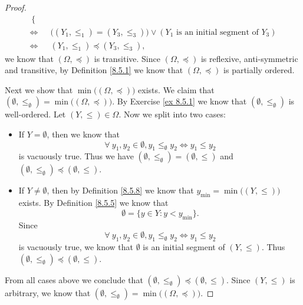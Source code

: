 \begin{proof}
\begin{align*}
\begin{cases}
        \end{cases}                                                                                                                                         \\
        \iff & \big((Y_1, \leq_1) = (Y_3, \leq_3)\big) \lor (Y_1 \text{ is an initial segment of } Y_3)                                                                           \\
        \iff & (Y_1, \leq_1) \preceq (Y_3, \leq_3),
    \end{align*}
    we know that \((\Omega, \preceq)\) is transitive.
    Since \((\Omega, \preceq)\) is reflexive, anti-symmetric and transitive, by Definition \ref{8.5.1} we know that \((\Omega, \preceq)\) is partially ordered.

    Next we show that \(\min\big((\Omega, \preceq)\big)\) exists.
    We claim that \((\emptyset, \leq_{\emptyset}) = \min\big((\Omega, \preceq)\big)\).
    By Exercise \ref{ex 8.5.1} we know that \((\emptyset, \leq_{\emptyset})\) is well-ordered.
    Let \((Y, \leq) \in \Omega\).
    Now we split into two cases:
    \begin{itemize}
        \item If \(Y = \emptyset\), then we know that
              \[
                  \forall\ y_1, y_2 \in \emptyset, y_1 \leq_{\emptyset} y_2 \iff y_1 \leq y_2
              \]
              is vacuously true.
              Thus we have \((\emptyset, \leq_{\emptyset}) = (\emptyset, \leq)\) and \((\emptyset, \leq_{\emptyset}) \preceq (\emptyset, \leq)\).
        \item If \(Y \neq \emptyset\), then by Definition \ref{8.5.8} we know that \(y_{\min} = \min\big((Y, \leq)\big)\) exists.
              By Definition \ref{8.5.5} we know that
              \[
                  \emptyset = \{y \in Y : y < y_{\min}\}.
              \]
              Since
              \[
                  \forall\ y_1, y_2 \in \emptyset, y_1 \leq_{\emptyset} y_2 \iff y_1 \leq y_2
              \]
              is vacuously true, we know that \(\emptyset\) is an initial segment of \((Y, \leq)\).
              Thus \((\emptyset, \leq_{\emptyset}) \preceq (\emptyset, \leq)\).
    \end{itemize}
    From all cases above we conclude that \((\emptyset, \leq_{\emptyset}) \preceq (\emptyset, \leq)\).
    Since \((Y, \leq)\) is arbitrary, we know that \((\emptyset, \leq_{\emptyset}) = \min\big((\Omega, \preceq)\big)\).


\end{proof}
